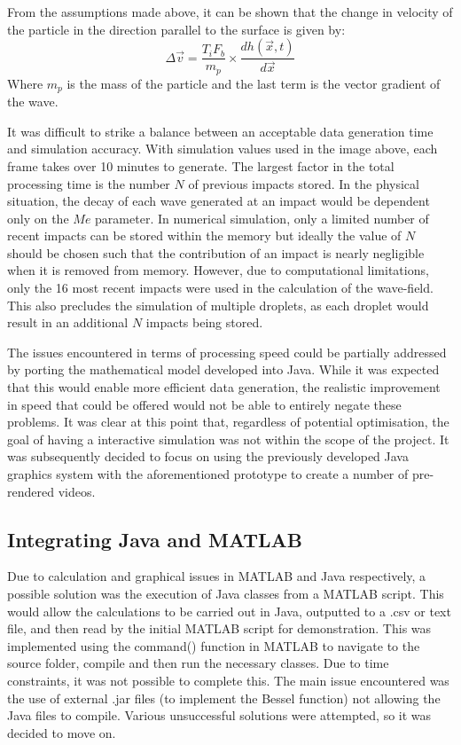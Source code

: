 From the assumptions made above, it can be shown that the change in velocity of the particle in the direction parallel to the surface is given by:
\begin{equation} \Delta \vec{v} = \frac{T_i  F_b}{m_p} \times \frac{dh(\vec{x} , t)}{d\vec{x}}\end{equation}
Where $m_p$ is the mass of the particle and the last term is the vector gradient of the wave.


It was difficult to strike a balance between an acceptable data generation time and simulation accuracy. With simulation values used in the image above, each frame takes over 10 minutes to generate. The largest factor in the total processing time is the number $N$ of previous impacts stored. In the physical situation, the decay of each wave generated at an impact would be dependent only on the $Me$ parameter. \cite{couder11} In numerical simulation, only a limited number of recent impacts can be stored within the memory but ideally the value of $N$ should be chosen such that the contribution of an impact is nearly negligible when it is removed from memory. However, due to computational limitations, only the 16 most recent impacts were used in the calculation of the wave-field. This also precludes the simulation of multiple droplets, as each droplet would result in an additional $N$ impacts being stored.

The issues encountered in terms of processing speed could be partially addressed by porting the mathematical model developed into Java.  While it was expected that this would enable more efficient data generation, the realistic improvement in speed that could be offered would not be able to entirely negate these problems.
It was clear at this point that, regardless of potential optimisation, the goal of having a interactive simulation was not within the scope of the project. It was subsequently  decided to focus on using the previously developed Java graphics system with the aforementioned prototype  to create a number of pre-rendered videos.

\subsection{Integrating Java and MATLAB}

Due to calculation and graphical issues in  MATLAB and Java respectively, a possible solution was the execution of Java classes from a MATLAB script. This would allow the calculations to be carried out in Java, outputted to a .csv or text file, and then read by the initial MATLAB script for demonstration. This was implemented using the command() function in MATLAB to navigate to the source folder, compile and then run the necessary classes. Due to time constraints, it was not possible to complete this. The main issue encountered was the use of external .jar files (to implement the Bessel function) not allowing the Java files to compile. Various unsuccessful solutions were attempted, so it was decided to move on.


